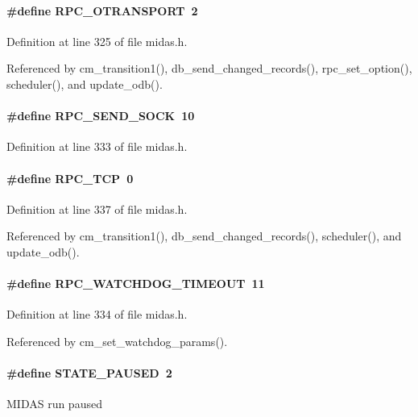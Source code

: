 \paragraph[{RPC\_\-OTRANSPORT}]{\setlength{\rightskip}{0pt plus 5cm}\#define RPC\_\-OTRANSPORT~2}\hfill\label{group__mdefineh_ga42ebe781b990fe561db5759b1ce9b633}


Definition at line 325 of file midas.h.

Referenced by cm\_\-transition1(), db\_\-send\_\-changed\_\-records(), rpc\_\-set\_\-option(), scheduler(), and update\_\-odb().
\paragraph[{RPC\_\-SEND\_\-SOCK}]{\setlength{\rightskip}{0pt plus 5cm}\#define RPC\_\-SEND\_\-SOCK~10}\hfill\label{group__mdefineh_gaefa1ff29b841be454a632f5f3083d344}


Definition at line 333 of file midas.h.
\paragraph[{RPC\_\-TCP}]{\setlength{\rightskip}{0pt plus 5cm}\#define RPC\_\-TCP~0}\hfill\label{group__mdefineh_ga9d0de5957c2c776323a0c74e668f544d}


Definition at line 337 of file midas.h.

Referenced by cm\_\-transition1(), db\_\-send\_\-changed\_\-records(), scheduler(), and update\_\-odb().
\paragraph[{RPC\_\-WATCHDOG\_\-TIMEOUT}]{\setlength{\rightskip}{0pt plus 5cm}\#define RPC\_\-WATCHDOG\_\-TIMEOUT~11}\hfill\label{group__mdefineh_gabc2142bbf1d961c3702ddcc8791388c0}


Definition at line 334 of file midas.h.

Referenced by cm\_\-set\_\-watchdog\_\-params().
\paragraph[{STATE\_\-PAUSED}]{\setlength{\rightskip}{0pt plus 5cm}\#define STATE\_\-PAUSED~2}\hfill\label{group__mdefineh_gab08c47284371c683ba80d6b3244400f1}
MIDAS run paused 

